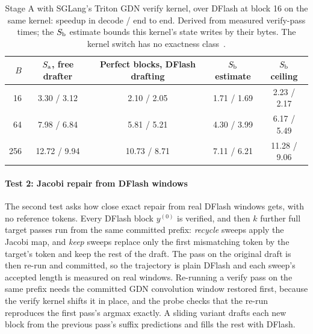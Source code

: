 \begin{table}[htbp]
\tablefont\centering
\caption{Stage A with SGLang's Triton GDN verify kernel, over DFlash at block 16 on the same kernel: speedup in decode / end to end. Derived from measured verify-pass times; the $S_{\rm b}$ estimate bounds this kernel's state writes by their bytes. The kernel switch has no exactness class~.}
\label{tab:stagea-triton}
\vskip 0.05in
\begin{tabular}{@{}rcccc@{}}\toprule
$B$ & $S_{\rm a}$, free drafter & Perfect blocks, DFlash drafting & $S_{\rm b}$ estimate & $S_{\rm b}$ ceiling\\\midrule
16 & 3.30 / 3.12 & 2.10 / 2.05 & 1.71 / 1.69 & 2.23 / 2.17\\
64 & 7.98 / 6.84 & 5.81 / 5.21 & 4.30 / 3.99 & 6.17 / 5.49\\
256 & 12.72 / 9.94 & 10.73 / 8.71 & 7.11 / 6.21 & 11.28 / 9.06\\\bottomrule
\end{tabular}
\end{table}

\paragraph{Test 2: Jacobi repair from DFlash windows}\label{sec:repair-jacobi} The second test asks how close exact repair from real DFlash windows gets, with no reference tokens. Every DFlash block $y^{(0)}$ is verified, and then $k$ further full target passes run from the same committed prefix: \emph{recycle} sweeps apply the Jacobi map, and \emph{keep} sweeps replace only the first mismatching token by the target's token and keep the rest of the draft. The pass on the original draft is then re-run and committed, so the trajectory is plain DFlash and each sweep's accepted length is measured on real windows. Re-running a verify pass on the same prefix needs the committed GDN convolution window restored first, because the verify kernel shifts it in place, and the probe checks that the re-run reproduces the first pass's argmax exactly. A sliding variant drafts each new block from the previous pass's suffix predictions and fills the rest with DFlash.

